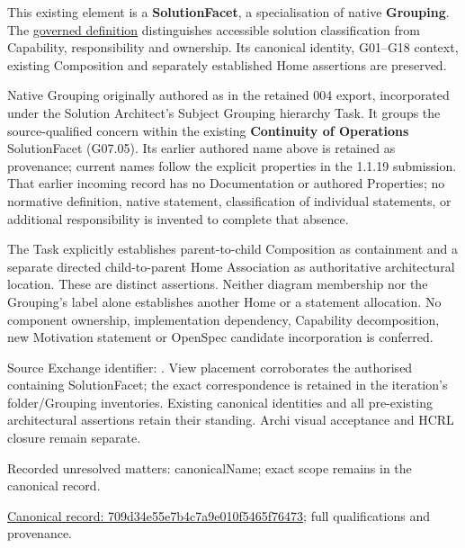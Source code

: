 This existing element is a \textbf{SolutionFacet}, a specialisation of native
\textbf{Grouping}. The \href{\detokenize{../../../../../../../governance/continuum-representation.md#solutionfacet-classification--1119-candidate}}{governed definition}
distinguishes accessible solution classification from Capability, responsibility
and ownership. Its canonical identity, G01–G18 context, existing Composition
and separately established Home assertions are preserved.



Native Grouping originally authored as \texttt{} in the retained 004 export,
incorporated under the Solution Architect's Subject Grouping hierarchy Task.
It groups the source-qualified \texttt{} concern within
the existing \textbf{Continuity of Operations} SolutionFacet (G07.05). Its earlier authored name above is retained as provenance; current names
follow the explicit properties in the 1.1.19 submission.
That earlier incoming record has no Documentation or authored Properties; no normative
definition, native statement, classification of individual statements, or
additional responsibility is invented to complete that absence.



The Task explicitly establishes parent-to-child Composition as containment and
a separate directed child-to-parent Home Association as authoritative architectural
location. These are distinct assertions. Neither diagram membership nor the
Grouping's label alone establishes another Home or a statement allocation.
No component ownership, implementation dependency, Capability decomposition,
new Motivation statement or OpenSpec candidate incorporation is conferred.



Source Exchange identifier: \texttt{}. View placement corroborates
the authorised containing SolutionFacet; the exact correspondence is retained in the
iteration's folder/Grouping inventories. Existing canonical identities and all
pre-existing architectural assertions retain their standing. Archi visual
acceptance and HCRL closure remain separate.


{\small Recorded unresolved matters: canonicalName; exact scope remains in the canonical record.}\par
{\footnotesize \href{../../../../../../../continuum/grouping/709d34e55e7b4c7a9e010f5465f76473.md}{Canonical record: 709d34e55e7b4c7a9e010f5465f76473}; full qualifications and provenance.}\par
